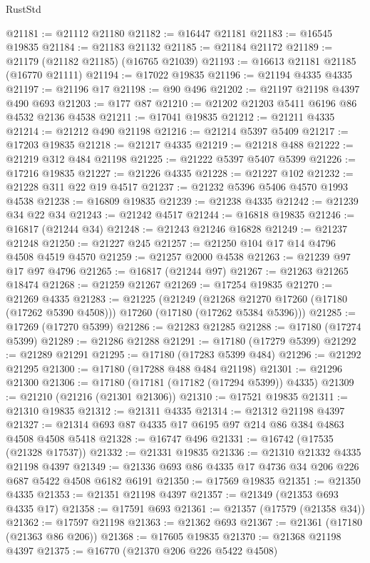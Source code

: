 \begin{lexlean}{RustStd}
\begin{coremodule}
{\begin{coremodule}
{{{{{{{{{{{{{{{{{{{{{{{{{{{{{{{{{{{{{{{{{{{{{{{{{{{{{{{@21181 := @21112 @21180
@21182 := @16447 @21181
@21183 := @16545 @19835
@21184 := @21183 @21132
@21185 := @21184 @21172
@21189 := @21179 (@21182 @21185) (@16765 @21039)
@21193 := @16613 @21181 @21185 (@16770 @21111)
@21194 := @17022 @19835
@21196 := @21194 @4335 @4335
@21197 := @21196 @17
@21198 := @90 @496
@21202 := @21197 @21198 @4397 @490 @693
@21203 := @177 @87
@21210 := @21202 @21203 @5411 @6196 @86 @4532 @2136 @4538
@21211 := @17041 @19835
@21212 := @21211 @4335
@21214 := @21212 @490 @21198
@21216 := @21214 @5397 @5409
@21217 := @17203 @19835
@21218 := @21217 @4335
@21219 := @21218 @488
@21222 := @21219 @312 @484 @21198
@21225 := @21222 @5397 @5407 @5399
@21226 := @17216 @19835
@21227 := @21226 @4335
@21228 := @21227 @102
@21232 := @21228 @311 @22 @19 @4517
@21237 := @21232 @5396 @5406 @4570 @1993 @4538
@21238 := @16809 @19835
@21239 := @21238 @4335
@21242 := @21239 @34 @22 @34
@21243 := @21242 @4517
@21244 := @16818 @19835
@21246 := @16817 (@21244 @34)
@21248 := @21243 @21246 @16828
@21249 := @21237 @21248
@21250 := @21227 @245
@21257 := @21250 @104 @17 @14 @4796 @4508 @4519 @4570
@21259 := @21257 @2000 @4538
@21263 := @21239 @97 @17 @97 @4796
@21265 := @16817 (@21244 @97)
@21267 := @21263 @21265 @18474
@21268 := @21259 @21267
@21269 := @17254 @19835
@21270 := @21269 @4335
@21283 := @21225
    (@21249
      (@21268 @21270 @17260 (@17180 (@17262 @5390 @4508)))
      @17260
      (@17180 (@17262 @5384 @5396)))
@21285 := @17269 (@17270 @5399)
@21286 := @21283 @21285
@21288 := @17180 (@17274 @5399)
@21289 := @21286 @21288
@21291 := @17180 (@17279 @5399)
@21292 := @21289 @21291
@21295 := @17180 (@17283 @5399 @484)
@21296 := @21292 @21295
@21300 := @17180 (@17288 @488 @484 @21198)
@21301 := @21296 @21300
@21306 := @17180 (@17181 (@17182 (@17294 @5399)) @4335)
@21309 := @21210 (@21216 (@21301 @21306))
@21310 := @17521 @19835
@21311 := @21310 @19835
@21312 := @21311 @4335
@21314 := @21312 @21198 @4397
@21327 := @21314 @693 @87 @4335 @17 @6195 @97 @214 @86 @384 @4863 @4508 @4508 @5418
@21328 := @16747 @496
@21331 := @16742 (@17535 (@21328 @17537))
@21332 := @21331 @19835
@21336 := @21310 @21332 @4335 @21198 @4397
@21349 := @21336 @693 @86 @4335 @17 @4736 @34 @206 @226 @687 @5422 @4508 @6182 @6191
@21350 := @17569 @19835
@21351 := @21350 @4335
@21353 := @21351 @21198 @4397
@21357 := @21349 (@21353 @693 @4335 @17)
@21358 := @17591 @693
@21361 := @21357 (@17579 (@21358 @34))
@21362 := @17597 @21198
@21363 := @21362 @693
@21367 := @21361 (@17180 (@21363 @86 @206))
@21368 := @17605 @19835
@21370 := @21368 @21198 @4397
@21375 := @16770 (@21370 @206 @226 @5422 @4508)
}}}}}}}}}}}}}}}}}}}}}}}}}}}}}}}}}}}}}}}}}}}}}}}}}}}}}}}
\end{coremodule}}
\end{coremodule}
\end{lexlean}
